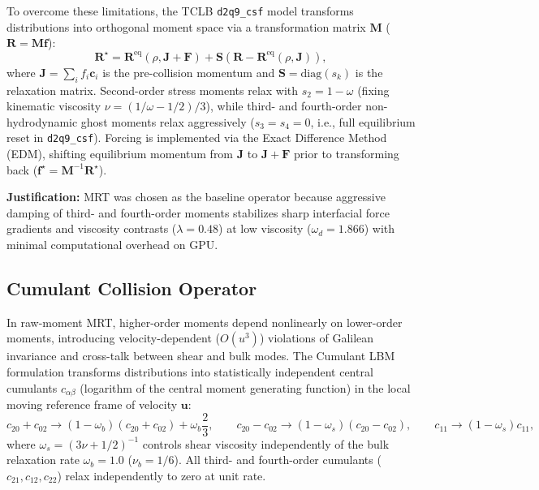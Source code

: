 \documentclass[11pt,a4paper]{article}
\begin{document}
To overcome these limitations, the TCLB \texttt{d2q9\_csf} model transforms distributions into orthogonal moment space via a transformation matrix $\mathbf{M}$ ($\mathbf{R} = \mathbf{M}\mathbf{f}$):
\begin{equation}
    \mathbf{R}^{\star} = \mathbf{R}^{\mathrm{eq}}(\rho, \mathbf{J} + \mathbf{F}) + \mathbf{S}\left(\mathbf{R} - \mathbf{R}^{\mathrm{eq}}(\rho, \mathbf{J})\right),
\end{equation}
where $\mathbf{J} = \sum_i f_i \mathbf{c}_i$ is the pre-collision momentum and $\mathbf{S} = \mathrm{diag}(s_k)$ is the relaxation matrix. Second-order stress moments relax with $s_2 = 1 - \omega$ (fixing kinematic viscosity $\nu = (1/\omega - 1/2)/3$), while third- and fourth-order non-hydrodynamic ghost moments relax aggressively ($s_3 = s_4 = 0$, i.e., full equilibrium reset in \texttt{d2q9\_csf}). Forcing is implemented via the Exact Difference Method (EDM), shifting equilibrium momentum from $\mathbf{J}$ to $\mathbf{J} + \mathbf{F}$ prior to transforming back ($\mathbf{f}^{\star} = \mathbf{M}^{-1}\mathbf{R}^{\star}$).

\textbf{Justification:} MRT was chosen as the baseline operator because aggressive damping of third- and fourth-order moments stabilizes sharp interfacial force gradients and viscosity contrasts ($\lambda = 0.48$) at low viscosity ($\omega_d = 1.866$) with minimal computational overhead on GPU.

\subsection{Cumulant Collision Operator}

In raw-moment MRT, higher-order moments depend nonlinearly on lower-order moments, introducing velocity-dependent ($O(u^3)$) violations of Galilean invariance and cross-talk between shear and bulk modes. The Cumulant LBM formulation transforms distributions into statistically independent central cumulants $c_{\alpha\beta}$ (logarithm of the central moment generating function) in the local moving reference frame of velocity $\mathbf{u}$:
\begin{equation}
    c_{20} + c_{02} \to (1 - \omega_b)(c_{20} + c_{02}) + \omega_b \frac{2}{3}, \qquad c_{20} - c_{02} \to (1 - \omega_s)(c_{20} - c_{02}), \qquad c_{11} \to (1 - \omega_s)c_{11},
\end{equation}
where $\omega_s = (3\nu + 1/2)^{-1}$ controls shear viscosity independently of the bulk relaxation rate $\omega_b = 1.0$ ($\nu_b = 1/6$). All third- and fourth-order cumulants ($c_{21}, c_{12}, c_{22}$) relax independently to zero at unit rate.
\end{document}
